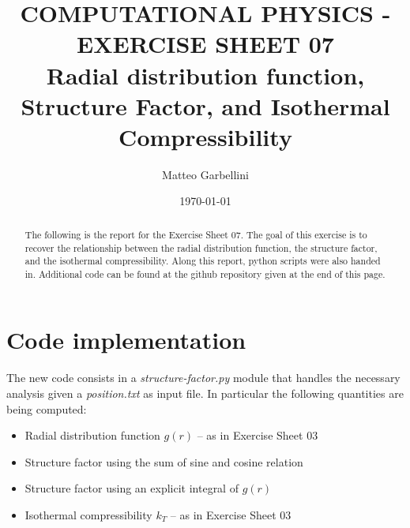 \documentclass[aps,pra,reprint, onecolumn, rmp]{revtex4-2}
\begin{document}
\title{COMPUTATIONAL PHYSICS - EXERCISE SHEET 07 \\Radial distribution function, Structure Factor, and Isothermal Compressibility}

\author{Matteo Garbellini}


\date{\today}

\begin{abstract}
The following is the report for the Exercise Sheet 07. The goal of this exercise is to recover the relationship between the radial distribution function, the structure factor, and the isothermal compressibility. Along this report, python scripts were also handed in. Additional code can be found at the github repository given at the end of this page.
\end{abstract}


\maketitle



\section{Code implementation}
The new code consists in a \textit{structure-factor.py} module that handles the necessary analysis given a \textit{position.txt} as input file. In particular the following quantities are being computed:
\begin{itemize}
  \item Radial distribution function $g(r)$ -- as in Exercise Sheet 03 
  \item Structure factor using the sum of sine and cosine relation
  \item Structure factor using an explicit integral of $g(r)$
  \item Isothermal compressibility $k_T$ -- as in Exercise Sheet 03
\end{itemize}


\end{document}
